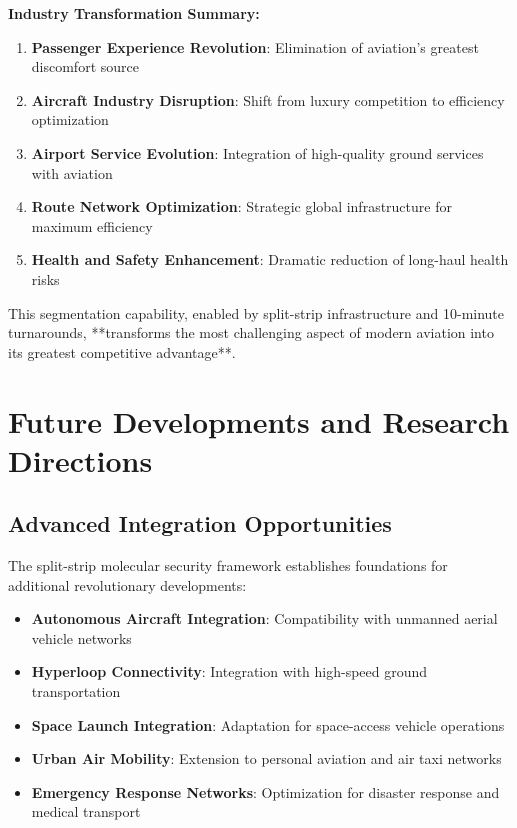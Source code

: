 \documentclass[12pt,a4paper]{article}
\begin{document}
\textbf{Industry Transformation Summary:}
\begin{enumerate}
\item \textbf{Passenger Experience Revolution}: Elimination of aviation's greatest discomfort source
\item \textbf{Aircraft Industry Disruption}: Shift from luxury competition to efficiency optimization
\item \textbf{Airport Service Evolution}: Integration of high-quality ground services with aviation
\item \textbf{Route Network Optimization}: Strategic global infrastructure for maximum efficiency
\item \textbf{Health and Safety Enhancement}: Dramatic reduction of long-haul health risks
\end{enumerate}

This segmentation capability, enabled by split-strip infrastructure and 10-minute turnarounds, **transforms the most challenging aspect of modern aviation into its greatest competitive advantage**.

\section{Future Developments and Research Directions}

\subsection{Advanced Integration Opportunities}

The split-strip molecular security framework establishes foundations for additional revolutionary developments:

\begin{itemize}
\item \textbf{Autonomous Aircraft Integration}: Compatibility with unmanned aerial vehicle networks
\item \textbf{Hyperloop Connectivity}: Integration with high-speed ground transportation
\item \textbf{Space Launch Integration}: Adaptation for space-access vehicle operations  
\item \textbf{Urban Air Mobility}: Extension to personal aviation and air taxi networks
\item \textbf{Emergency Response Networks}: Optimization for disaster response and medical transport
\end{itemize}
\end{document}
